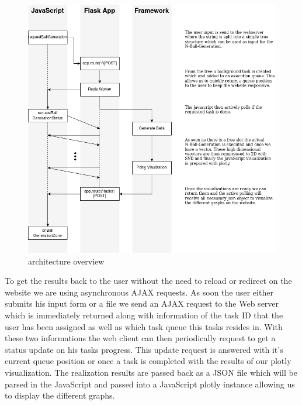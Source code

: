 \documentclass[]{article}
\begin{document}
\begin{figure}[H]
	\includegraphics[width=\textwidth]{res/overview.png}
	\caption{architecture overview}
	\label{fig:overview}
\end{figure}

To get the results back to the user without the need to reload or redirect on the website we are using asynchronous AJAX requests. As soon the user either submits his input form or a file we send an AJAX request to the Web server which is immediately returned along with information of the task ID that the user has been assigned as well as which task queue this tasks resides in. With these two informations the web client can then periodically request to get a status update on his tasks progress. This update request is answered with it's current queue position or once a task is completed with the results of our plotly visualization. The realization results are passed back as a JSON file which will be parsed in the JavaScript and passed into a JavaScript plotly instance allowing us to display the different graphs.
\end{document}
